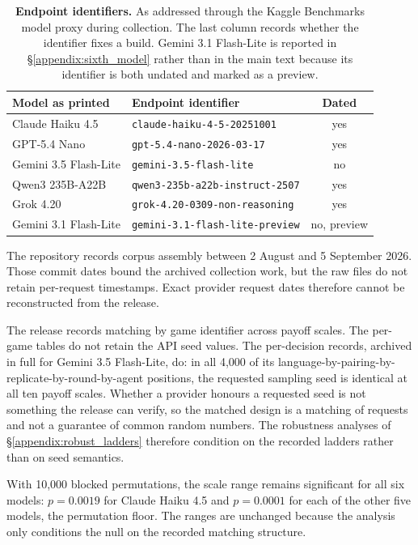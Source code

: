 \documentclass[openacc]{rsproca_new}
\newcommand{\rev}[1]{{\color{red}#1}}
\newcommand{\rev}[1]{#1}
\begin{document}
\begin{table}[htbp]
\centering
\footnotesize
\caption{\textbf{Endpoint identifiers.} As addressed through the Kaggle
Benchmarks model proxy during collection. The last column records whether the
identifier fixes a build. Gemini 3.1 Flash-Lite is reported in
\S\ref{appendix:sixth_model} rather than in the main text because its
identifier is both undated and marked as a preview.}
\label{tab:A-endpoints}
\begin{tabular}{@{}llc@{}}
\toprule
Model as printed & Endpoint identifier & Dated \\
\midrule
Claude Haiku 4.5      & \texttt{claude-haiku-4-5-20251001}      & yes \\
GPT-5.4 Nano          & \texttt{gpt-5.4-nano-2026-03-17}        & yes \\
Gemini 3.5 Flash-Lite & \texttt{gemini-3.5-flash-lite}          & no  \\
Qwen3 235B-A22B       & \texttt{qwen3-235b-a22b-instruct-2507}  & yes \\
Grok 4.20             & \texttt{grok-4.20-0309-non-reasoning}   & yes \\
Gemini 3.1 Flash-Lite & \texttt{gemini-3.1-flash-lite-preview}  & no, preview \\
\bottomrule
\end{tabular}
\end{table}

The repository records corpus assembly between 2 August and 5 September 2026.
Those commit dates bound the archived collection work, but the raw files do not
retain per-request timestamps. Exact provider request dates therefore cannot be
reconstructed from the release.

The release records matching by game identifier across payoff scales. \rev{The
per-game tables do not retain the API seed values. The per-decision records,
archived in full for Gemini 3.5 Flash-Lite, do: in all 4{,}000 of its
language-by-pairing-by-replicate-by-round-by-agent positions, the requested
sampling seed is identical at all ten payoff scales. Whether a provider honours
a requested seed is not something the release can verify, so the matched design
is a matching of requests and not a guarantee of common random numbers. The
robustness analyses of \S\ref{appendix:robust_ladders} therefore condition on
the recorded ladders rather than on seed semantics.}

With 10,000 blocked permutations, the scale range remains significant for all
six models: $p=0.0019$ for Claude Haiku 4.5 and $p=0.0001$ for each of the
other five models, the permutation floor. The ranges are unchanged because the
analysis only conditions the null on the recorded matching structure.
\end{document}
